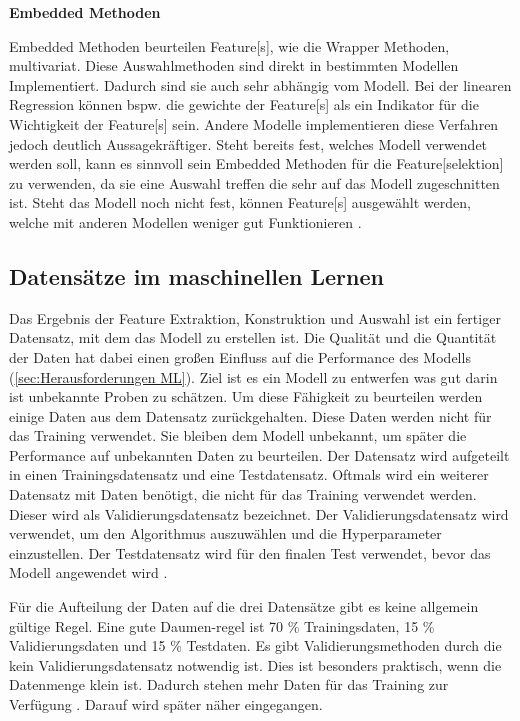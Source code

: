 \textbf{\gls{Embedded Methoden}}\par

 \gls{Embedded Methoden} beurteilen \gls{Feature}[s], wie die \gls{Wrapper Methoden}, multivariat. Diese Auswahlmethoden sind direkt in bestimmten Modellen Implementiert. Dadurch sind sie auch sehr abhängig vom Modell. Bei der linearen Regression können bspw. die gewichte der \gls{Feature}[s] als ein Indikator für die Wichtigkeit der \gls{Feature}[s] sein. Andere Modelle implementieren diese Verfahren jedoch deutlich Aussagekräftiger. Steht bereits fest, welches Modell verwendet werden soll, kann es sinnvoll sein \gls{Embedded Methoden} für die \gls{Feature}[selektion] zu verwenden, da sie eine Auswahl treffen die sehr auf das Modell zugeschnitten ist. Steht das Modell noch nicht fest, können \gls{Feature}[s] ausgewählt werden, welche mit anderen Modellen weniger gut Funktionieren \cite{Guyon.2003, Zheng.2018}.

 \subsection{Datensätze im maschinellen Lernen} \label{sec:Datensätze ML}
 Das Ergebnis der Feature Extraktion, Konstruktion und Auswahl ist ein fertiger Datensatz, mit dem das Modell zu erstellen ist. Die Qualität und die Quantität der Daten hat dabei einen großen Einfluss auf die Performance des Modells (\ref{sec:Herausforderungen ML}). Ziel ist es ein Modell zu entwerfen was gut darin ist unbekannte Proben zu schätzen. Um diese Fähigkeit zu beurteilen werden einige Daten aus dem Datensatz zurückgehalten. Diese Daten werden nicht für das Training verwendet. Sie bleiben dem Modell unbekannt, um später die Performance auf unbekannten Daten zu beurteilen. Der Datensatz wird aufgeteilt in einen \gls{Trainingsdatensatz} und eine \gls{Testdatensatz}. Oftmals wird ein weiterer Datensatz mit Daten benötigt, die nicht für das Training verwendet werden. Dieser wird als Validierungsdatensatz bezeichnet. Der Validierungsdatensatz wird verwendet, um den Algorithmus auszuwählen und die \gls{Hyperparameter} einzustellen. Der Testdatensatz wird für den finalen Test verwendet, bevor das Modell angewendet wird \cite{Burkov.2019}. \par

 Für die Aufteilung der Daten auf die drei Datensätze gibt es keine allgemein gültige Regel. Eine gute Daumen-regel ist 70 \% Trainingsdaten, 15 \% Validierungsdaten und 15 \% Testdaten. Es gibt Validierungsmethoden durch die kein Validierungsdatensatz notwendig ist. Dies ist besonders praktisch, wenn die Datenmenge klein ist. Dadurch stehen mehr Daten für das Training zur Verfügung \cite{Burkov.2019}. Darauf wird später näher eingegangen. \par

